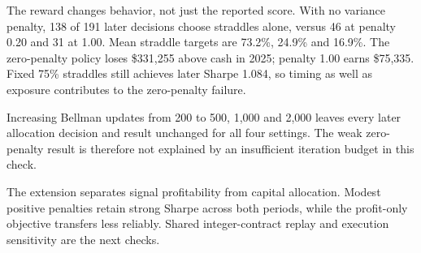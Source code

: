 The reward changes behavior, not just the reported score. With no variance penalty, 138 of 191 later decisions choose straddles alone, versus 46 at penalty 0.20 and 31 at 1.00. Mean straddle targets are 73.2\%, 24.9\% and 16.9\%. The zero-penalty policy loses \$331,255 above cash in 2025; penalty 1.00 earns \$75,335. Fixed 75\% straddles still achieves later Sharpe 1.084, so timing as well as exposure contributes to the zero-penalty failure.

Increasing Bellman updates from 200 to 500, 1,000 and 2,000 leaves every later allocation decision and result unchanged for all four settings. The weak zero-penalty result is therefore not explained by an insufficient iteration budget in this check.

The extension separates signal profitability from capital allocation. Modest positive penalties retain strong Sharpe across both periods, while the profit-only objective transfers less reliably. Shared integer-contract replay and execution sensitivity are the next checks.

